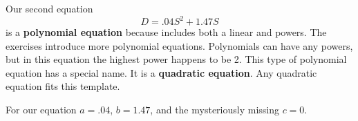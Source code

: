 \noindent Our second equation  $$D=.04S^2 + 1.47S$$ is a \textbf{polynomial equation} because includes both a linear and powers.  The exercises introduce more polynomial equations.   Polynomials can have any powers, but in this equation the highest power happens to be 2.  This type of polynomial equation has a special name.  It is a \textbf{quadratic equation}.  Any quadratic equation fits this template.

\bigskip
\bigskip

\noindent For our equation $a=.04$, $b=1.47$, and the mysteriously missing $c=0$. 

 